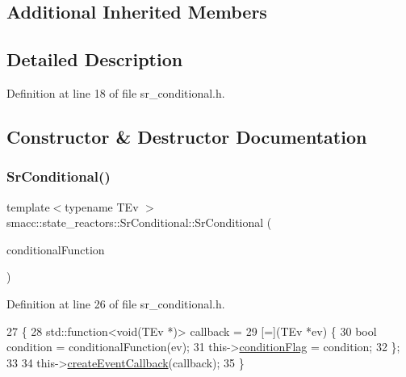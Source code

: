 \subsection*{Additional Inherited Members}


\subsection{Detailed Description}


Definition at line 18 of file sr\+\_\+conditional.\+h.



\subsection{Constructor \& Destructor Documentation}
\mbox{\label{classsmacc_1_1state__reactors_1_1SrConditional_ab89bc8f9d29e8a614eb6618af8596402}} 
\subsubsection{\texorpdfstring{Sr\+Conditional()}{SrConditional()}}
{\footnotesize\ttfamily template$<$typename T\+Ev $>$ \\
smacc\+::state\+\_\+reactors\+::\+Sr\+Conditional\+::\+Sr\+Conditional (\begin{DoxyParamCaption}\item[{std\+::function$<$ \hyperlink{classbool}{bool}(T\+Ev $\ast$)$>$}]{conditional\+Function }\end{DoxyParamCaption})\hspace{0.3cm}{\ttfamily [inline]}}



Definition at line 26 of file sr\+\_\+conditional.\+h.


\begin{DoxyCode}
27     \{
28         std::function<void(TEv *)> callback =
29             [=](TEv *ev) \{
30                 \textcolor{keywordtype}{bool} condition = conditionalFunction(ev);
31                 this->\hyperlink{classsmacc_1_1state__reactors_1_1SrConditional_a3642c78c02f02ed8eb0e5a41240f445c}{conditionFlag} = condition;
32             \};
33 
34         this->\hyperlink{classsmacc_1_1StateReactor_a68482e08f6449694a0bcda843b14b376}{createEventCallback}(callback);
35     \}
\end{DoxyCode}
\mbox{\label{classsmacc_1_1state__reactors_1_1SrConditional_a36266efcfd8ba0582ed500bd51e7d2b6}} 
